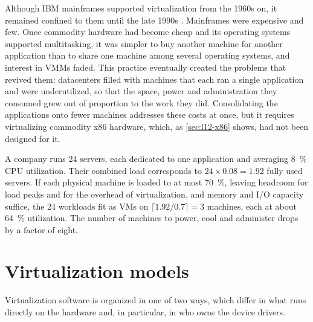 \documentclass[../main.tex]{subfiles}
\begin{document}
Although IBM mainframes supported virtualization from the 1960s on, it
remained confined to them until the late 1990s
\cite{rosenblum2005}.
Mainframes were expensive and few.  Once commodity hardware had become
cheap and its operating systems supported multitasking, it was simpler to
buy another
machine for another application than to share one machine among several
operating systems, and interest in VMMs faded.  This practice eventually
created the problems that revived them: datacenters filled with machines
that each ran a single application and were underutilized, so that the
space, power and administration they consumed grew out of proportion to
the work they did.  Consolidating the applications onto fewer machines
addresses these costs at once, but it requires virtualizing commodity
x86 hardware, which, as \cref{sec:l12-x86} shows, had not been designed for
it.

\begin{example}
  A company runs 24 servers, each dedicated to one application and
  averaging \SI{8}{\percent} CPU utilization.  Their combined load
  corresponds to $24 \times 0.08 = 1.92$ fully used servers.  If each
  physical machine is loaded to at most \SI{70}{\percent}, leaving headroom
  for load peaks and for the overhead of virtualization, and memory and
  I/O capacity suffice, the 24 workloads fit as VMs on
  $\lceil 1.92/0.7 \rceil = 3$ machines, each at about \SI{64}{\percent}
  utilization.  The number of machines to power, cool and administer drops
  by a factor of eight.
\end{example}

\section{Virtualization models}
\label{sec:l12-models}

Virtualization software is organized in one of two ways, which differ in
what runs directly on the hardware and, in particular, in who owns the
device drivers.
\end{document}
